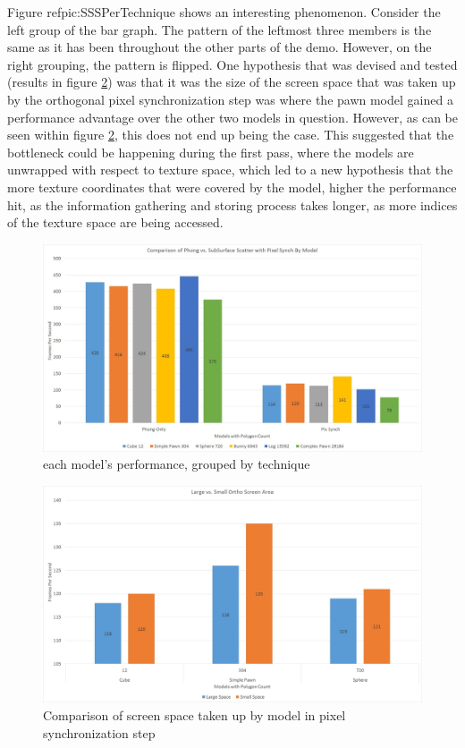 \documentclass[a4paper, 12pt]{article}
\begin{document}
\noindent  Figure ref{pic:SSSPerTechnique} shows an interesting phenomenon.
Consider the left group of the bar graph. The pattern of the leftmost three
members is the same as it has been throughout the other parts of the demo.
However, on the right grouping, the pattern is flipped. One hypothesis that
was devised and tested (results in figure \ref{pic:SSSOrthoSize}) was that it
was the size of the screen space that was taken up by the orthogonal pixel
synchronization step was where the pawn model gained a performance advantage
over the other two models in question. However, as can be seen within figure
\ref{pic:SSSOrthoSize}, this does not end up being the case. This suggested
that the bottleneck could be happening during the first pass, where the models
are unwrapped with respect to texture space, which led to a new hypothesis
that the more texture coordinates that were covered by the model, higher the
performance hit, as the information gathering and storing process takes
longer, as more indices of the texture space are being accessed.

\begin{figure}[!htb]
	\centering
	\includegraphics[width=1.0\textwidth]{SSSPerTechnique.jpg}
	\caption{each model's performance, grouped by technique}
	\label{pic:SSSPerTechnique}
\end{figure}

\begin{figure}[!htb]
	\centering
	\includegraphics[width=1.0\textwidth]{SSSOrthoSize.jpg}
	\caption{Comparison of screen space taken up by model in pixel synchronization step}
	\label{pic:SSSOrthoSize}
\end{figure}
\end{document}
